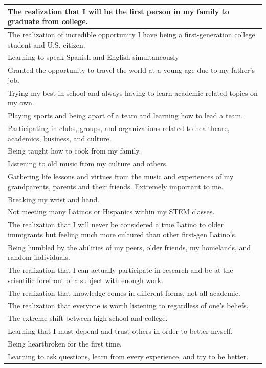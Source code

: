 \documentclass[
  .7em,
  letterpaper,
  DIV=11,
  numbers=noendperiod]{scrartcl}
\begin{document}
\begin{table}
\begin{tabular}{l}
\hline
The realization that I will be the first person in my family to graduate from college.\\
\hline
The realization of incredible opportunity I have being a first-generation college student and U.S. citizen.\\
\hline
Learning to speak Spanish and English simultaneously\\
\hline
Granted the opportunity to travel the world at a young age due to my father's job.\\
\hline
Trying my best in school and always having to learn academic related topics on my own.\\
\hline
Playing sports and being apart of a team and learning how to lead a team.\\
\hline
Participating in clubs, groups, and organizations related to healthcare, academics, business, and culture.\\
\hline
Being taught how to cook from my family.\\
\hline
Listening to old music from my culture and others.\\
\hline
Gathering life lessons and virtues from the music and experiences of my grandparents, parents and their friends. Extremely important to me.\\
\hline
Breaking my wrist and hand.\\
\hline
Not meeting many Latinos or Hispanics within my STEM classes.\\
\hline
The realization that I will never be considered a true Latino to older immigrants but feeling much more cultured than other first-gen Latino's.\\
\hline
Being humbled by the abilities of my peers, older friends, my homelands, and random individuals.\\
\hline
The realization that I can actually participate in research and be at the scientific forefront of a subject with enough work.\\
\hline
The realization that knowledge comes in different forms, not all academic.\\
\hline
The realization that everyone is worth listening to regardless of one's beliefs.\\
\hline
The extreme shift between high school and college.\\
\hline
Learning that I must depend and trust others in order to better myself.\\
\hline
Being heartbroken for the first time.\\
\hline
Learning to ask questions, learn from every experience, and try to be better.\\

\end{tabular}
\end{table}
\end{document}
